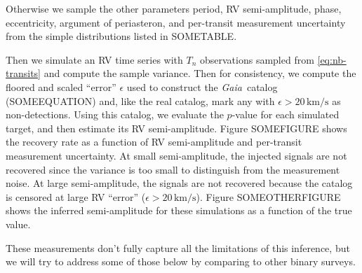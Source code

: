 \documentclass[modern, letterpaper]{aastex631}
\newcommand{\project}[1]{\textsl{#1}}
\newcommand{\Gaia}{\project{Gaia}}
\begin{document}
Otherwise we sample the other parameters period, RV semi-amplitude, phase, eccentricity, argument of periasteron, and per-transit measurement uncertainty from the simple distributions listed in SOMETABLE.

Then we simulate an RV time series with $T_n$ observations sampled from \autoref{eq:nb-transits} and compute the sample variance.
Then for consistency, we compute the floored and scaled ``error'' $\epsilon$ used to construct the \Gaia\ catalog (SOMEEQUATION) and, like the real catalog, mark any with $\epsilon > 20\,\mathrm{km/s}$ as non-detections.
Using this catalog, we evaluate the $p$-value for each simulated target, and then estimate its RV semi-amplitude.
Figure SOMEFIGURE shows the recovery rate as a function of RV semi-amplitude and per-transit measurement uncertainty.
At small semi-amplitude, the injected signals are not recovered since the variance is too small to distinguish from the measurement noise.
At large semi-amplitude, the signals are not recovered because the catalog is censored at large RV ``error'' ($\epsilon > 20\,\mathrm{km/s}$).
Figure SOMEOTHERFIGURE shows the inferred semi-amplitude for these simulations as a function of the true value.

These measurements don't fully capture all the limitations of this inference, but we will try to address some of those below by comparing to other binary surveys.

\end{document}
